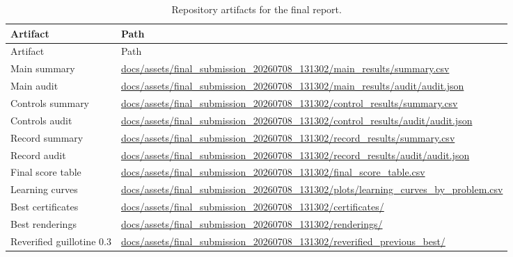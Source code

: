 \documentclass[11pt]{article}
\newcommand{\artifact}[1]{{\footnotesize\url{#1}}}
\begin{document}
\begin{longtable}{@{}p{}p{}@{}}
\caption{Repository artifacts for the final report.}\\
\toprule
Artifact & Path \\
\midrule
\endfirsthead
\toprule
Artifact & Path \\
\midrule
\endhead
\bottomrule
\endfoot
Main summary & \artifact{docs/assets/final_submission_20260708_131302/main_results/summary.csv} \\
Main audit & \artifact{docs/assets/final_submission_20260708_131302/main_results/audit/audit.json} \\
Controls summary & \artifact{docs/assets/final_submission_20260708_131302/control_results/summary.csv} \\
Controls audit & \artifact{docs/assets/final_submission_20260708_131302/control_results/audit/audit.json} \\
Record summary & \artifact{docs/assets/final_submission_20260708_131302/record_results/summary.csv} \\
Record audit & \artifact{docs/assets/final_submission_20260708_131302/record_results/audit/audit.json} \\
Final score table & \artifact{docs/assets/final_submission_20260708_131302/final_score_table.csv} \\
Learning curves & \artifact{docs/assets/final_submission_20260708_131302/plots/learning_curves_by_problem.csv} \\
Best certificates & \artifact{docs/assets/final_submission_20260708_131302/certificates/} \\
Best renderings & \artifact{docs/assets/final_submission_20260708_131302/renderings/} \\
Reverified guillotine $0.3$ & \artifact{docs/assets/final_submission_20260708_131302/reverified_previous_best/} \\
\end{longtable}
\end{document}
